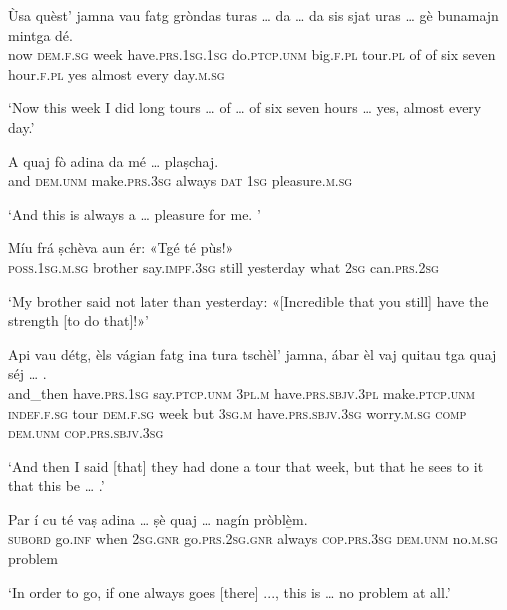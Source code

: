 \begin{linenumbers}
\gll Ùsa quèst’ jamna vau fatg gròndas turas … da … da sis sjat uras … gè bunamajn mintga dé.  \\
now \textsc{dem.f.sg} week  have.\textsc{prs.1sg.1sg} do.\textsc{ptcp.unm} big.\textsc{f.pl} tour.\textsc{pl} {} of {} of six seven hour.\textsc{f.pl} {} yes almost every day.\textsc{m.sg}  \\
\end{linenumbers}
\medskip
\glt `Now this week I did long tours … of … of six seven hours … yes, almost every day.'
\medskip

\begin{linenumbers}
\gll  A quaj fò adina da mé … plaṣchaj.  \\
and \textsc{dem.unm} make.\textsc{prs.3sg} always \textsc{dat} \textsc{1sg} {} pleasure.\textsc{m.sg} \\
\end{linenumbers}
\medskip
\glt `And this is always a … pleasure for me. '
\medskip

\begin{linenumbers}
\gll Míu frá ṣchèva aun ér: «Tgé té pùs!»   \\
\textsc{poss.1sg.m.sg} brother say.\textsc{impf.3sg} still yesterday what \textsc{2sg} can.\textsc{prs.2sg} \\
\end{linenumbers}
\medskip
\glt `My brother said not later than yesterday: «[Incredible that you still] have the strength [to do that]!»'
\medskip

\begin{linenumbers}
\gll Api vau détg, èls vágian fatg ina tura tschèl’ jamna, ábar èl vaj quitau tga quaj séj … .\\  
and\_then have.\textsc{prs.1sg} say.\textsc{ptcp.unm} \textsc{3pl.m} have.\textsc{prs.sbjv.3pl} make.\textsc{ptcp.unm} \textsc{indef.f.sg} tour  \textsc{dem.f.sg} week but \textsc{3sg.m} have.\textsc{prs.sbjv.3sg} worry.\textsc{m.sg} \textsc{comp} \textsc{dem.unm} \textsc{cop.prs.sbjv.3sg} \\
\end{linenumbers}
\medskip
\glt `And then I said [that] they had done a tour that week, but that he sees to it that this be … .'
\medskip

\begin{linenumbers}
\gll  Par í cu té vaṣ adina … ṣè quaj … nagín pròblè̱m.  \\
\textsc{subord} go.\textsc{inf} when \textsc{2sg.gnr} go.\textsc{prs.2sg.gnr} always {} \textsc{cop.prs.3sg} \textsc{dem.unm} {} no.\textsc{m.sg} problem \\
\end{linenumbers}
\medskip
\glt `In order to go, if one always goes [there] ..., this is … no problem at all.'
\medskip

